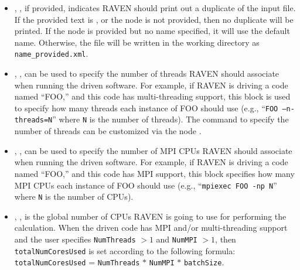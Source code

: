 \begin{itemize}
\item {}, , if provided, indicates RAVEN should print out a
  duplicate of the input file.  If the provided text is , or the node is not provided, then
  no duplicate will be printed.  If the node is provided but no name specified, it will use the default name.
  Otherwise, the file will be written in the working directory as \texttt{name\_provided.xml}.
%

\item {}, , can be used to
specify the number of threads RAVEN should associate when running the driven
software.
%
For example, if RAVEN is driving a code named ``FOO,'' and this code has
multi-threading support, this block is used to specify how many threads each
instance of FOO should use (e.g., ``\texttt{FOO --n-threads=N}'' where \texttt{N}
 is the number of threads). The command to specify the number of threads can be
customized via the node .
%

\item {}, , can be used to
specify the number of MPI CPUs RAVEN should associate when running the driven
software.
%
For example, if RAVEN is driving a code named ``FOO,'' and this code has MPI
support, this block specifies how many MPI CPUs each instance of FOO should use
(e.g., ``\texttt{mpiexec FOO -np N}'' where \texttt{N} is the number of CPUs).
%

\item {}, , is the
global number of CPUs RAVEN is going to use for performing the calculation.
%
When the driven code has MPI and/or multi-threading support and the user
specifies \texttt{NumThreads} $> 1$  and \texttt{NumMPI} $> 1$, then
\texttt{totalNumCoresUsed} is set according to the following formula:\\
\texttt{totalNumCoresUsed} = \texttt{NumThreads} $*$ \texttt{NumMPI} $*$
\texttt{batchSize}.
%



\end{itemize}
